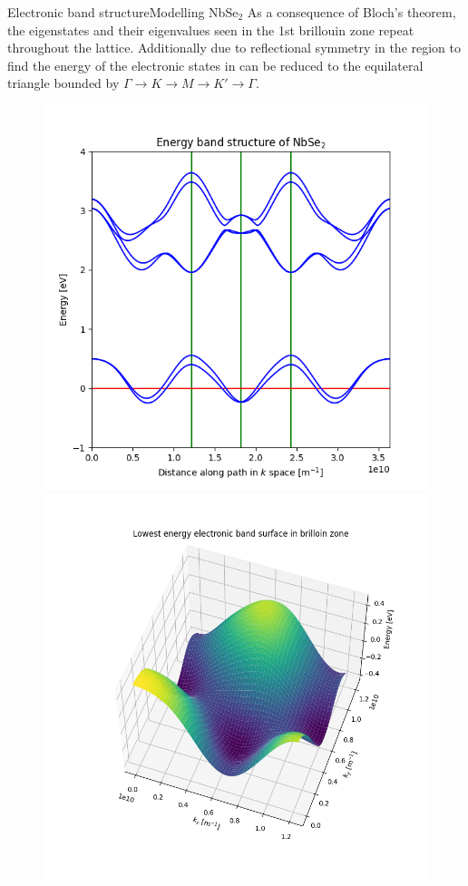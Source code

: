 \documentclass[9pt]{beamer}
\begin{document}
\begin{frame}{Electronic band structure}{Modelling NbSe$_2$}
  As a consequence of Bloch's theorem, the eigenstates and their eigenvalues seen in the 1st brillouin zone repeat throughout the lattice. Additionally due to reflectional symmetry in the region to find the energy of the electronic states in can be reduced to the equilateral triangle bounded by $\Gamma \rightarrow K \rightarrow M \rightarrow K' \rightarrow \Gamma$.

  \begin{figure}
  \centering
  \begin{minipage}{.5\textwidth}
    \centering
    \includegraphics[width=.9\linewidth]{evalues_1.png}
  \end{minipage}%
  \begin{minipage}{.5\textwidth}
    \centering
    \includegraphics[width=.9\linewidth]{unrotated_surface.png}

\end{minipage}
\end{figure}
\end{frame}
\end{document}
